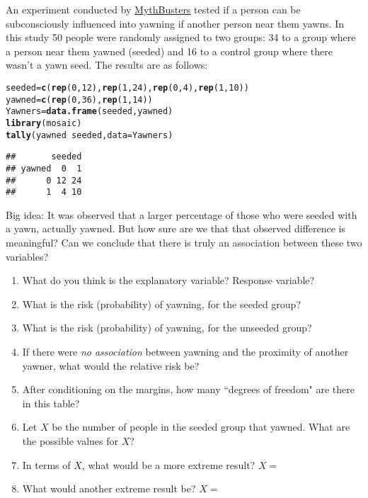 \documentclass[10pt]{article}\usepackage[]{graphicx}\usepackage[]{color}
\makeatletter
\newcommand{\hlnum}[1]{\textcolor[rgb]{0.686,0.059,0.569}{#1}}%
\newcommand{\hlopt}[1]{\textcolor[rgb]{0,0,0}{#1}}%
\newcommand{\hlstd}[1]{\textcolor[rgb]{0.345,0.345,0.345}{#1}}%
\newcommand{\hlkwb}[1]{\textcolor[rgb]{0.69,0.353,0.396}{#1}}%
\newcommand{\hlkwc}[1]{\textcolor[rgb]{0.333,0.667,0.333}{#1}}%
\newcommand{\hlkwd}[1]{\textcolor[rgb]{0.737,0.353,0.396}{\textbf{#1}}}%
\newenvironment{kframe}{%
 \def\at@end@of@kframe{}%
 \ifinner\ifhmode%
  \def\at@end@of@kframe{\end{minipage}}%
  \begin{minipage}{\columnwidth}%
 \fi\fi%
 \def\FrameCommand##1{\hskip\@totalleftmargin \hskip-\fboxsep
 \colorbox{shadecolor}{##1}\hskip-\fboxsep
     \hskip-\linewidth \hskip-\@totalleftmargin \hskip\columnwidth}%
 \MakeFramed {\advance\hsize-\width
   \@totalleftmargin\z@ \linewidth\hsize
   \@setminipage}}%
 {\par\unskip\endMakeFramed%
 \at@end@of@kframe}
\newenvironment{knitrout}{}{} %
\makeatother
\begin{document}
An experiment conducted by \href{http://www.discovery.com/tv-shows/mythbusters/videos/is-yawning-contagious-minimyth/}{MythBusters} tested if a person can be subconsciously influenced into yawning if another person near them yawns. 
In this study 50 people were randomly assigned to two groups: 34 to a group where a person near them yawned (seeded) and 16 to a control group where there wasn't a yawn seed. The results are as follows:

\begin{knitrout}
\color{fgcolor}\begin{kframe}
\begin{alltt}
\hlstd{seeded} \hlkwb{=} \hlkwd{c}\hlstd{(}\hlkwd{rep}\hlstd{(}\hlnum{0}\hlstd{,} \hlnum{12}\hlstd{),} \hlkwd{rep}\hlstd{(}\hlnum{1}\hlstd{,} \hlnum{24}\hlstd{),} \hlkwd{rep}\hlstd{(}\hlnum{0}\hlstd{,} \hlnum{4}\hlstd{),} \hlkwd{rep}\hlstd{(}\hlnum{1}\hlstd{,} \hlnum{10}\hlstd{))}
\hlstd{yawned} \hlkwb{=} \hlkwd{c}\hlstd{(}\hlkwd{rep}\hlstd{(}\hlnum{0}\hlstd{,} \hlnum{36}\hlstd{),} \hlkwd{rep}\hlstd{(}\hlnum{1}\hlstd{,} \hlnum{14}\hlstd{))}
\hlstd{Yawners} \hlkwb{=} \hlkwd{data.frame}\hlstd{(seeded, yawned)}
\hlkwd{library}\hlstd{(mosaic)}
\hlkwd{tally}\hlstd{(yawned} \hlopt{~} \hlstd{seeded,} \hlkwc{data} \hlstd{= Yawners)}
\end{alltt}
\begin{verbatim}
##       seeded
## yawned  0  1
##      0 12 24
##      1  4 10
\end{verbatim}
\end{kframe}
\end{knitrout}


Big idea: It was observed that a larger percentage of those who were seeded with a yawn, actually yawned. But how sure are we that that observed difference is meaningful? Can we conclude that there is truly an association between these two variables?  
\clearpage

\begin{enumerate}
  \itemsep2cm
  \item What do you think is the explanatory variable?  Response variable? 
  \item What is the risk (probability) of yawning, for the seeded group?
  \item What is the risk (probability) of yawning, for the unseeded group?
  \item If there were \emph{no association} between yawning and the proximity of another yawner, what would the relative risk be?
  \item After conditioning on the margins, how many ``degrees of freedom" are there in this table?
  \item Let $X$ be the number of people in the seeded group that yawned.  What are the possible values for $X$?
  \item In terms of $X$, what would be a more extreme result?  $X = $
  \item What would another extreme result be?  $X = $
\end{enumerate}
\end{document}
